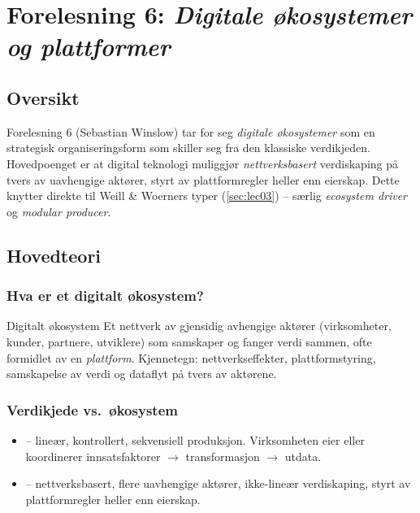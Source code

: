 \section{Forelesning 6: \emph{Digitale økosystemer og plattformer}}
\label{sec:lec06}

\subsection*{Oversikt}
Forelesning 6 (Sebastian Winslow) tar for seg \emph{digitale økosystemer} som
en strategisk organiseringsform som skiller seg fra den klassiske verdikjeden.
Hovedpoenget er at digital teknologi muliggjør \emph{nettverksbasert}
verdiskaping på tvers av uavhengige aktører, styrt av plattformregler heller
enn eierskap. Dette knytter direkte til Weill \& Woerners typer
(\autoref{sec:lec03}) -- særlig \emph{ecosystem driver} og \emph{modular
producer}.

\subsection{Hovedteori}

\subsubsection*{Hva er et digitalt økosystem?}

\begin{definition}{Digitalt økosystem}
Et nettverk av gjensidig avhengige aktører (virksomheter, kunder, partnere,
utviklere) som samskaper og fanger verdi sammen, ofte formidlet av en
\emph{plattform}. Kjennetegn: nettverkseffekter, plattformstyring,
samskapelse av verdi og dataflyt på tvers av aktørene.
\end{definition}

\subsubsection*{Verdikjede vs.\ økosystem}
\begin{itemize}
  \item {} -- lineær, kontrollert, sekvensiell produksjon.
    Virksomheten eier eller koordinerer innsatsfaktorer $\rightarrow$
    transformasjon $\rightarrow$ utdata.
  \item {} -- nettverksbasert, flere uavhengige aktører,
    ikke-lineær verdiskaping, styrt av plattformregler heller enn eierskap.
\end{itemize}

